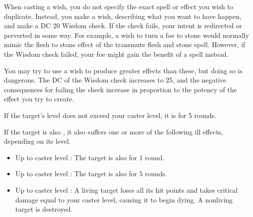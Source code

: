 \par When casting a wish, you do not specify the exact spell or effect you wish to duplicate. Instead, you make a wish, describing what you want to have happen, and make a DC 20 Wisdom check. If the check fails, your intent is redirected or perverted in some way. For example, a wish to turn a foe to stone would normally mimic the flesh to stone effect of the transmute flesh and stone spell. However, if the Wisdom check failed, your foe might gain the benefit of a  spell instead.
\par You may try to use a wish to produce greater effects than these, but doing so is dangerous. The DC of the Wisdom check increases to 25, and the negative consequences for failing the check increase in proportion to the potency of the effect you try to create.

\begin{spellheader}
\end{spellheader}
\begin{spelleffects}
    \spelleffect If the target's level does not exceed your caster level, it is \bewildered for 5 rounds.

    If the target is also \bloodied, it also suffers one or more of the following ill effects, depending on its level.
    \begin{itemize}
        \item Up to caster level : The target is also \confused for 1 round.
        \item Up to caster level : The target is also \paralyzed for 5 rounds.
        \item Up to caster level : A living target loses all its hit points and takes critical damage equal to your caster level, causing it to begin dying. A nonliving target is destroyed.
    \end{itemize}
\end{spelleffects}
\begin{spellfooter}

\end{spellfooter}


